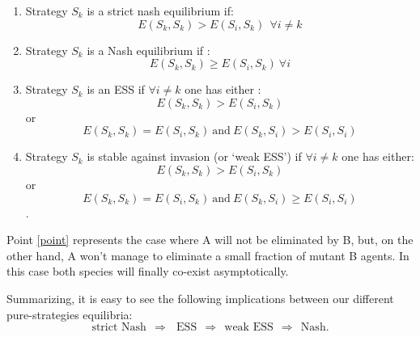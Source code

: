 \begin{enumerate}
\item Strategy $S_k$ is a strict nash equilibrium if:
\[E(S_k,S_k) > E(S_i, S_k)~~ \forall i \neq k\]
\item Strategy $S_k$ is a Nash equilibrium if :
\[E(S_k,S_k) \geq E(S_i,S_k) \ \forall i\]
\item Strategy $S_k$ is an ESS if $\forall i \neq k$ one has either :
\[E(S_k,S_k) > E(S_i, S_k)\]
or
\[E(S_k,S_k) = E(S_i,S_k)~\text{and}~ E(S_k,S_i) > E(S_i, S_i)\]
\item Strategy $S_k$ is stable against invasion (or `weak ESS') if $\forall i \neq k$ one has either:
\[E(S_k,S_k) > E(S_i,S_k)\]
or
\[E(S_k,S_k) = E(S_i,S_k)~\text{and}~E(S_k,S_i) \geq E(S_i,S_i)\] .\label{point}
\end{enumerate}
Point \ref{point} represents the case where A will not be eliminated by B, but, on the other hand, A won't manage to eliminate a small fraction of mutant B agents.  In this case both species will finally co-exist asymptotically.
%

Summarizing, it is easy to see the following implications between our different pure-strategies equilibria:
\begin{equation}
\text{strict Nash}~~\Rightarrow~~~\text{ESS}~~\Rightarrow~~\text{weak ESS}~~\Rightarrow~~\text{Nash}.
\end{equation}

